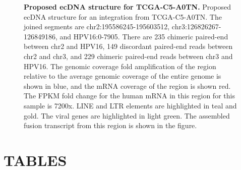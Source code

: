 \documentclass[a4,center,fleqn]{NAR}
\begin{document}
\begin{figure}[htpb]
  \centering
\caption[Proposed ecDNA structure for TCGA-C5-A0TN.]
{\label{tcga_c5_a0tn}  {\bf Proposed ecDNA structure for TCGA-C5-A0TN.}  Proposed ecDNA structure for an integration from TCGA-C5-A0TN.   The joined segments are chr2:195586245-195603512, chr3:126826267-126849186, and HPV16:0-7905.  There are 235 chimeric paired-end between chr2 and HPV16, 149 discordant paired-end reads between chr2 and chr3, and 229 chimeric paired-end reads between
chr3 and HPV16.  The genomic coverage fold amplification of the region relative to the average genomic coverage of the entire genome is shown in blue, and the mRNA coverage of the region is shown red.  The FPKM fold change for the human mRNA in this region for this sample is 7200x.  LINE and LTR elements are highlighted in teal and gold.  The viral genes are highlighted in light green.  The assembled fusion transcript from this region is shown in the figure.}
\end{figure}
\clearpage
\section{TABLES}
\begin{table}[htpb]
\centering
\caption{\textbf{Overview of datasets}.  We provide an overview of the datasets used throughout this study.  }
\label{table:data}
\end{table}
\end{document}
